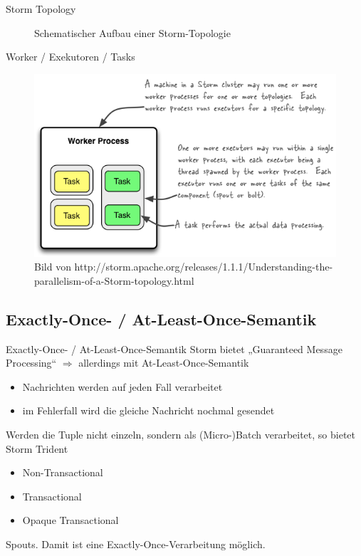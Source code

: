 \documentclass{beamer}
\begin{document}
\begin{frame}[t]{Storm Topology}
  \begin{figure}[h]
    \center
    \scalebox{.7}{}
    \caption{Schematischer Aufbau einer Storm-Topologie}
    \label{fig:topology}
  \end{figure}
\end{frame}

\begin{frame}[t]{Worker / Exekutoren / Tasks}
  \begin{figure}
    \centering
    \includegraphics[scale=0.8]{img/relationships-worker-processes-executors-tasks.png}
    \caption{ Bild von http://storm.apache.org/releases/1.1.1/Understanding-the-parallelism-of-a-Storm-topology.html}
  \end{figure}
\end{frame}


\subsection{Exactly-Once- / At-Least-Once-Semantik}
\begin{frame}[t]{Exactly-Once- / At-Least-Once-Semantik}
  Storm bietet „Guaranteed Message Processing“ $\Rightarrow$ allerdings mit
  At-Least-Once-Semantik
  \begin{itemize}
    \item Nachrichten werden auf jeden Fall verarbeitet
    \item im Fehlerfall wird die gleiche Nachricht nochmal gesendet
  \end{itemize}
  \pause
  Werden die Tuple nicht einzeln, sondern als (Micro-)Batch verarbeitet, so bietet Storm Trident
  \begin{itemize}
    \item Non-Transactional
    \item Transactional
    \item Opaque Transactional
  \end{itemize}
  Spouts. Damit ist eine Exactly-Once-Verarbeitung möglich.
\end{frame}
\end{document}
